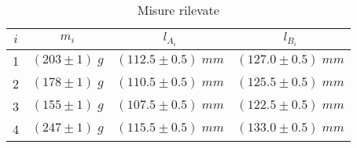 \begin{table}[h!]
    
    \hspace{5mm} 
    \begin{tabular}{|c|c|c|c|}
        \hline
        $i$ & $m_i$& $l_{A_i}$ & $l_{B_i}$\\
        \hline
        1 & $(203 \pm 1)\; g$  & $(112.5\pm 0.5) \;mm$ & $(127.0\pm 0.5) \;mm$\\
        2 & $(178 \pm 1)\; g$  & $(110.5\pm 0.5) \;mm$ & $(125.5\pm 0.5) \;mm$\\
        3 & $(155 \pm 1)\; g$  & $(107.5\pm 0.5) \;mm$ & $(122.5\pm 0.5) \;mm$\\
        4 & $(247 \pm 1)\; g$  & $(115.5\pm 0.5) \;mm$ & $(133.0\pm 0.5) \;mm$\\
       


        \hline
    \end{tabular}
    \caption{Misure rilevate}
    \label{tabellaDati}
\end{table}
